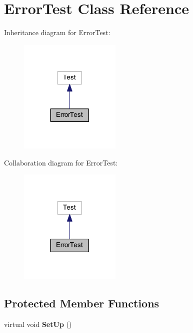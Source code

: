 \hypertarget{class_error_test}{}\section{Error\+Test Class Reference}
\label{class_error_test}


Inheritance diagram for Error\+Test\+:\nopagebreak
\begin{figure}[H]
\begin{center}
\leavevmode
\includegraphics[width=137pt]{class_error_test__inherit__graph}
\end{center}
\end{figure}


Collaboration diagram for Error\+Test\+:\nopagebreak
\begin{figure}[H]
\begin{center}
\leavevmode
\includegraphics[width=137pt]{class_error_test__coll__graph}
\end{center}
\end{figure}
\subsection*{Protected Member Functions}
\begin{DoxyCompactItemize}
\item 
\hypertarget{class_error_test_a282955d762cb937af68efea62c37fccd}{}\label{class_error_test_a282955d762cb937af68efea62c37fccd} 
virtual void {\bfseries Set\+Up} ()
\end{DoxyCompactItemize}
